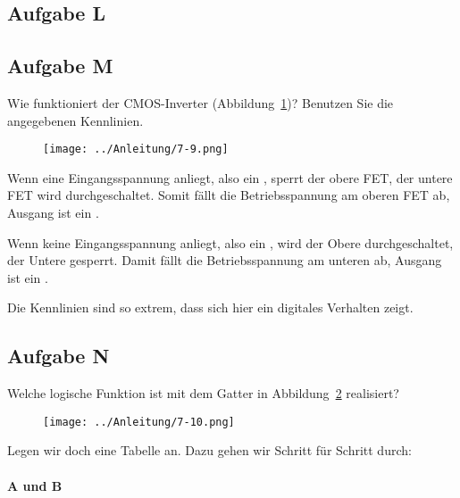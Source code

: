 \FloatBarrier
\subsection{Aufgabe L}

\fehlt

\FloatBarrier
\subsection{Aufgabe M}

\begin{problem}
	Wie funktioniert der CMOS-Inverter (Abbildung~\ref{fig:7-9})? Benutzen Sie
	die angegebenen Kennlinien.
\end{problem}

\begin{figure}[htbp]
	\centering
	\texttt{[image: ../Anleitung/7-9.png]}
	\caption{%
		\cite[Abbildung~7.9]{physik313-Anleitung}
	}
	\label{fig:7-9}
\end{figure}

Wenn eine Eingangsspannung anliegt, also ein \thigh, sperrt der obere FET, der
untere FET wird durchgeschaltet. Somit fällt die Betriebsspannung am oberen FET
ab, Ausgang ist ein \tlow.

Wenn keine Eingangsspannung anliegt, also ein \tlow, wird der Obere
durchgeschaltet, der Untere gesperrt. Damit fällt die Betriebsspannung am
unteren ab, Ausgang ist ein \thigh.

Die Kennlinien sind so extrem, dass sich hier ein digitales Verhalten zeigt.

\FloatBarrier
\subsection{Aufgabe N}

\begin{problem}
	Welche logische Funktion ist mit dem Gatter in Abbildung~\ref{fig:7-10}
	realisiert?
\end{problem}

\begin{figure}[htbp]
	\centering
	\texttt{[image: ../Anleitung/7-10.png]}
	\caption{%
		\cite[Abbildung~7.10]{physik313-Anleitung}
	}
	\label{fig:7-10}
\end{figure}

Legen wir doch eine Tabelle an. Dazu gehen wir Schritt für Schritt durch:

\paragraph{A und B \tlow}

